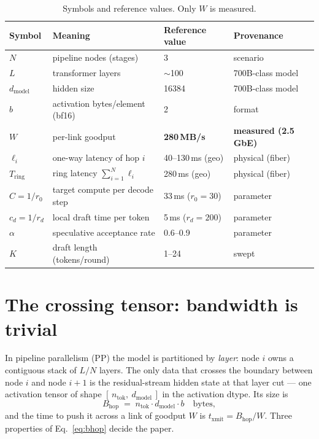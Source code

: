 \documentclass[11pt]{article}
\newcommand{\Tring}{\ensuremath{T_{\mathrm{ring}}}}
\newcommand{\dmodel}{\ensuremath{d_{\mathrm{model}}}}
\begin{document}
\begin{table}[h]
\centering
\small
\caption{Symbols and reference values. Only $W$ is measured.}
\label{tab:params}
\begin{tabular}{l l l l}
\toprule
Symbol & Meaning & Reference value & Provenance\\
\midrule
$N$        & pipeline nodes (stages)                 & 3                 & scenario\\
$L$        & transformer layers                      & $\sim$100         & 700B-class model\\
\dmodel    & hidden size                             & 16384             & 700B-class model\\
$b$        & activation bytes/element (bf16)         & 2                 & format\\
$W$        & per-link goodput                        & \textbf{280\,MB/s} & \textbf{measured (2.5\,GbE)}\\
$\ell_i$   & one-way latency of hop $i$              & 40--130\,ms (geo) & physical (fiber)\\
$\Tring$   & ring latency $\sum_{i=1}^N \ell_i$      & 280\,ms (geo)     & physical (fiber)\\
$C=1/r_0$  & target compute per decode step          & 33\,ms ($r_0{=}30$) & parameter\\
$c_d=1/r_d$& local draft time per token              & 5\,ms ($r_d{=}200$) & parameter\\
$\alpha$   & speculative acceptance rate             & 0.6--0.9          & parameter\\
$K$        & draft length (tokens/round)             & 1--24             & swept\\
\bottomrule
\end{tabular}
\end{table}

\section{The crossing tensor: bandwidth is trivial}
\label{sec:bandwidth}

In pipeline parallelism (PP) the model is partitioned by \emph{layer}: node $i$ owns a contiguous
stack of $L/N$ layers. The only data that crosses the boundary between node $i$ and node $i{+}1$ is
the residual-stream hidden state at that layer cut --- one activation tensor of shape
$[\,n_{\mathrm{tok}},\ \dmodel\,]$ in the activation dtype. Its size is
\begin{equation}
B_{\mathrm{hop}} \;=\; n_{\mathrm{tok}}\cdot \dmodel \cdot b \quad\text{bytes},
\label{eq:bhop}
\end{equation}
and the time to push it across a link of goodput $W$ is $t_{\mathrm{xmit}}=B_{\mathrm{hop}}/W$.
Three properties of Eq.~\eqref{eq:bhop} decide the paper.
\end{document}
